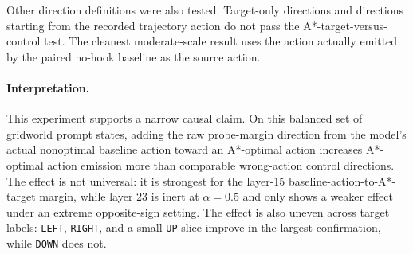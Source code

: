 \documentclass[10pt,twocolumn]{article}
\begin{document}
Other direction definitions were also tested. Target-only directions and
directions starting from the recorded trajectory action do not pass the
A*-target-versus-control test. The cleanest moderate-scale result uses the
action actually emitted by the paired no-hook baseline as the source action.

\paragraph{Interpretation.}
This experiment supports a narrow causal claim. On this balanced set of
gridworld prompt states, adding the raw probe-margin direction from the model's
actual nonoptimal baseline action toward an A*-optimal action increases
A*-optimal action emission more than comparable wrong-action control
directions. The effect is not universal: it is strongest for the layer-15
baseline-action-to-A*-target margin, while layer 23 is inert at $\alpha=0.5$
and only shows a weaker effect under an extreme opposite-sign setting. The
effect is also uneven across target labels: \texttt{LEFT}, \texttt{RIGHT}, and
a small \texttt{UP} slice improve in the largest confirmation, while
\texttt{DOWN} does not.
\end{document}
